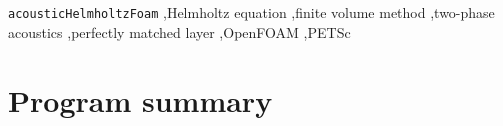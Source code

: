 \documentclass[final,num,12pt]{elsarticle}
\begin{document}
\begin{frontmatter}


\begin{keyword}
\texttt{acousticHelmholtzFoam} \sep Helmholtz equation \sep finite volume method \sep two-phase acoustics \sep perfectly matched layer \sep OpenFOAM \sep PETSc



\end{keyword}

\end{frontmatter}



\linenumbers

\section*{Program summary}
\end{document}
